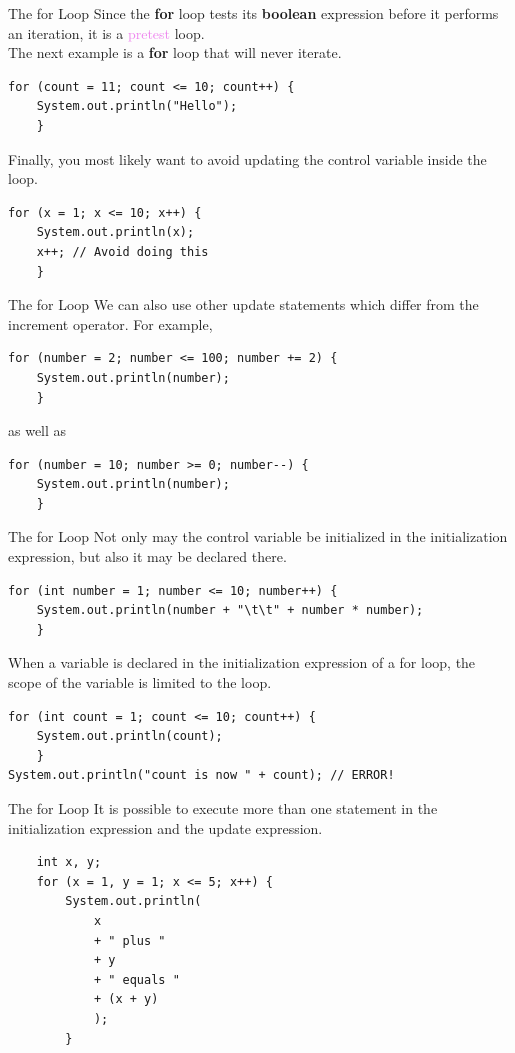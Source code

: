 \documentclass[11pt]{beamer}
\newcommand{\violet}[1]{\textcolor{violet}{#1}}
\begin{document}
\begin{frame}[fragile]{The for Loop}
    Since the \textbf{for} loop tests its \textbf{boolean} expression before it performs an iteration, it is a \violet{pretest} loop. \\
    \vspace{1em}
    The next example is a \textbf{for} loop that will never iterate.
    \begin{lstlisting}
for (count = 11; count <= 10; count++) {
    System.out.println("Hello");
    }
    \end{lstlisting}
    Finally, you most likely want to avoid updating the control variable inside the loop.
    \begin{lstlisting}
for (x = 1; x <= 10; x++) {
    System.out.println(x);
    x++; // Avoid doing this
    }
    \end{lstlisting}
\end{frame}

\begin{frame}[fragile]{The for Loop}
We can also use other update statements which differ from the increment operator. For example,
    \begin{lstlisting}
for (number = 2; number <= 100; number += 2) {
    System.out.println(number);
    }
    \end{lstlisting}
    as well as
    \begin{lstlisting}
for (number = 10; number >= 0; number--) {
    System.out.println(number);
    }
    \end{lstlisting}
\end{frame}

\begin{frame}[fragile]{The for Loop}
    Not only may the control variable be initialized in the initialization expression, but also it may be declared there.
    \begin{lstlisting}
for (int number = 1; number <= 10; number++) {
    System.out.println(number + "\t\t" + number * number);
    }
    \end{lstlisting}
    When a variable is declared in the initialization expression of a for loop, the scope of the variable is limited to the loop.
    \begin{lstlisting}
for (int count = 1; count <= 10; count++) {
    System.out.println(count);
    }
System.out.println("count is now " + count); // ERROR!
    \end{lstlisting}
\end{frame}

\begin{frame}[fragile]{The for Loop}
    It is possible to execute more than one statement in the initialization expression and the update expression.
    \begin{lstlisting}
    int x, y;
    for (x = 1, y = 1; x <= 5; x++) {
        System.out.println(
            x
            + " plus " 
            + y 
            + " equals " 
            + (x + y)
            );
        }
    \end{lstlisting}
\end{frame}
\end{document}
